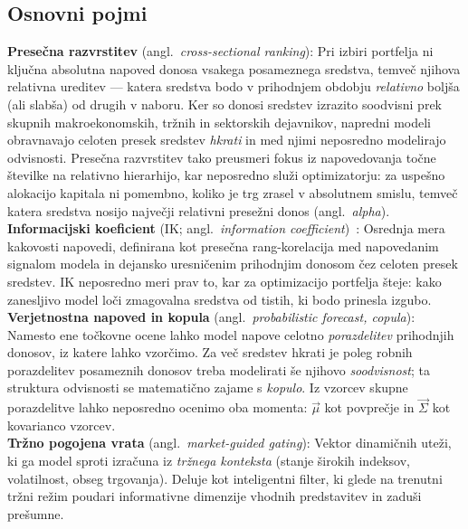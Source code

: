 \subsection{Osnovni pojmi}

\noindent\textbf{Presečna razvrstitev} (angl.\ \emph{cross-sectional ranking}): Pri izbiri portfelja ni ključna absolutna napoved donosa vsakega posameznega sredstva, temveč njihova relativna ureditev --- katera sredstva bodo v prihodnjem obdobju \emph{relativno} boljša (ali slabša) od drugih v naboru. Ker so donosi sredstev izrazito soodvisni prek skupnih makroekonomskih, tržnih in sektorskih dejavnikov, napredni modeli obravnavajo celoten presek sredstev \emph{hkrati} in med njimi neposredno modelirajo odvisnosti. Presečna razvrstitev tako preusmeri fokus iz napovedovanja točne številke na relativno hierarhijo, kar neposredno služi optimizatorju: za uspešno alokacijo kapitala ni pomembno, koliko je trg zrasel v absolutnem smislu, temveč katera sredstva nosijo največji relativni presežni donos (angl.\ \emph{alpha}).\\

\noindent\textbf{Informacijski koeficient} (IK; angl.\ \emph{information coefficient})~\cite{grinold2000}: Osrednja mera kakovosti napovedi, definirana kot presečna rang-korelacija med napovedanim signalom modela in dejansko uresničenim prihodnjim donosom čez celoten presek sredstev. IK neposredno meri prav to, kar za optimizacijo portfelja šteje: kako zanesljivo model loči zmagovalna sredstva od tistih, ki bodo prinesla izgubo.\\

\noindent\textbf{Verjetnostna napoved in kopula} (angl.\ \emph{probabilistic forecast, copula}): Namesto ene točkovne ocene lahko model napove celotno \emph{porazdelitev} prihodnjih donosov, iz katere lahko vzorčimo. Za več sredstev hkrati je poleg robnih porazdelitev posameznih donosov treba modelirati še njihovo \emph{soodvisnost}; ta struktura odvisnosti se matematično zajame s \emph{kopulo}. Iz vzorcev skupne porazdelitve lahko neposredno ocenimo oba momenta: $\vec{\mu}$ kot povprečje in $\vec{\Sigma}$ kot kovarianco vzorcev.\\

\noindent\textbf{Tržno pogojena vrata} (angl.\ \emph{market-guided gating}): Vektor dinamičnih uteži, ki ga model sproti izračuna iz \emph{tržnega konteksta} (stanje širokih indeksov, volatilnost, obseg trgovanja). Deluje kot inteligentni filter, ki glede na trenutni tržni režim poudari informativne dimenzije vhodnih predstavitev in zaduši prešumne.\\

